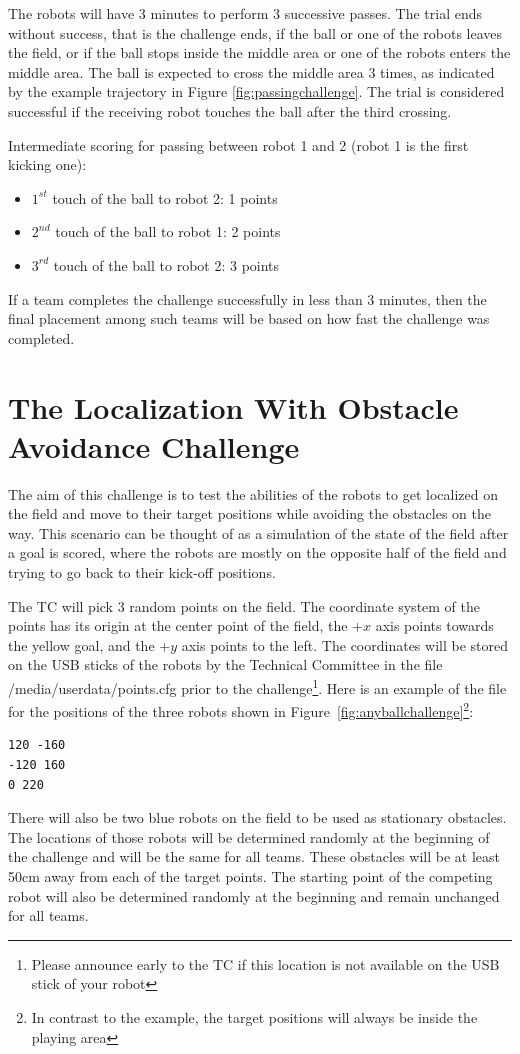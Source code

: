 \documentclass{article}
\begin{document}
The robots will have 3 minutes to perform 3 successive passes. The trial ends without success, that is the challenge ends, if the ball or one of the robots leaves the field, or if the ball stops inside the middle area or one of the robots enters the middle area. The ball is expected to cross the middle area 3 times, as indicated by the example trajectory in Figure \ref{fig:passingchallenge}. The trial is considered successful if the receiving robot touches the ball after the third crossing.

Intermediate scoring for passing between robot 1 and 2 (robot 1 is the first kicking one):
\begin{itemize}
 \item $1^{st}$ touch of the ball to robot 2:  1 points
 \item $2^{nd}$ touch of the ball to robot 1:  2 points
 \item $3^{rd}$ touch of the ball to robot 2:  3 points
\end{itemize}

If a team completes the challenge successfully in less than 3 minutes, then the final placement among such teams will be based on how fast the challenge was completed.

\section{The Localization With Obstacle Avoidance Challenge}
\label{sec:localization}

The aim of this challenge is to test the abilities of the robots to get localized on the field and move to their target positions while avoiding the obstacles on the way. This scenario can be thought of as a simulation of the state of the field after a goal is scored, where the robots are mostly on the opposite half of the field and trying to go back to their kick-off positions. 

The TC will pick 3 random points on the field. The coordinate system of the points has its origin at the center point of the field, the +$x$ axis points towards the yellow goal, and the +$y$ axis points to the left. The coordinates will be stored on the USB sticks of the robots by the Technical Committee in the file /media/userdata/points.cfg prior to the challenge\footnote{Please announce early to the TC if this location is not available on the USB stick of your robot}. Here is an example of the file for the positions of the three robots shown in Figure~\ref{fig:anyballchallenge}\footnote{In contrast to the example, the target positions will always be inside the playing area}:
%
{\small\begin{verbatim}
120 -160
-120 160
0 220
\end{verbatim}
}
%
There will also be two blue robots on the field to be used as stationary obstacles. The locations of those robots will be determined randomly at the beginning of the challenge and will be the same for all teams. These obstacles will be at least 50cm away from each of the target points. The starting point of the competing robot will also be determined randomly at the beginning and remain unchanged for all teams. 
\end{document}
